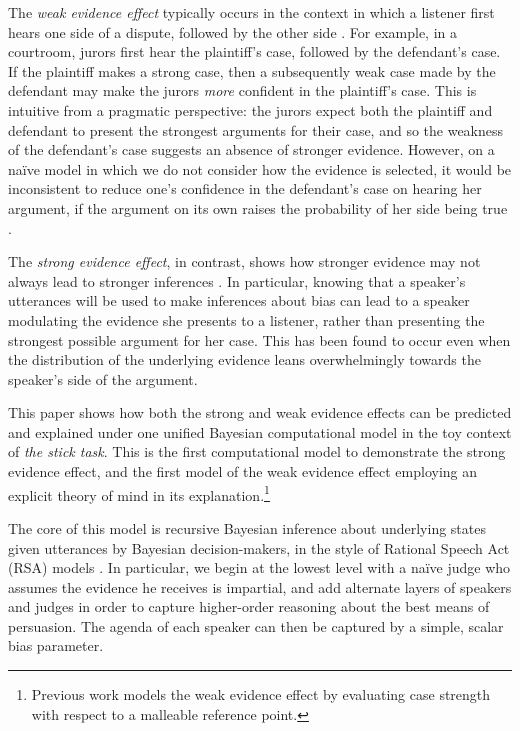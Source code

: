 \documentclass[10pt,letterpaper]{article}
\begin{document}
The \textit{weak evidence effect} typically occurs in the context in which a listener first
hears one side of a dispute, followed by the other side \cite{mckenzie_when_2002}.  For example, in a courtroom, jurors first
hear the plaintiff's case, followed by the defendant's case. If the plaintiff makes a strong case, then
a subsequently weak case made by the defendant may make the jurors \textit{more} confident in the 
plaintiff's case. This is intuitive from a pragmatic perspective: the jurors expect both the plaintiff and 
defendant to present the strongest arguments for their case, and so the weakness of the defendant's
case suggests an absence of stronger evidence. However, on a na\"ive model in which we do not
consider how the evidence is selected, it would be inconsistent to reduce one's confidence in the
defendant's case on hearing her argument, if the argument on its own raises the probability of her
side being true \cite{fernbach_when_2011}.

The \textit{strong evidence effect}, in contrast, shows how stronger evidence may not always lead
to stronger inferences \cite{perfors_stronger_2018}. In particular, knowing that a speaker's utterances will be used to make inferences
about bias can lead to a speaker modulating the evidence she presents to a listener, rather than presenting
the strongest possible argument for her case. This has been found to occur even when the distribution
of the underlying evidence leans overwhelmingly towards the speaker's side of the argument.

This paper shows how both the strong and weak evidence effects can be predicted and explained under
one unified Bayesian computational model in the toy context of \textit{the stick task}. 
This is the first computational model to demonstrate the 
strong evidence effect, and the first model of the weak evidence effect employing an explicit theory of mind
in its explanation.\footnote{Previous work models the weak evidence effect by evaluating case strength with
respect to a malleable reference point.}

The core of this model is recursive Bayesian inference about underlying states given utterances by Bayesian
decision-makers, in the style of Rational Speech Act (RSA) models \cite{goodman_pragmatic_2016}. In particular, we begin at the lowest level
with a na\"ive judge who assumes the evidence he receives is impartial, and add alternate layers of speakers
and judges in order to capture higher-order reasoning about the best means of persuasion. The agenda
of each speaker can then be captured by a simple, scalar bias parameter.
\end{document}
